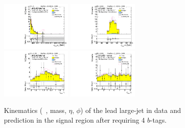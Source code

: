 \begin{figure}[htbp!]
\begin{center}
\includegraphics[width=0.31\textwidth,angle=-90]{figures/boosted/Signal/b77_FourTag_Signal_leadHCand_Pt_m.pdf}
\includegraphics[width=0.31\textwidth,angle=-90]{figures/boosted/Signal/b77_FourTag_Signal_leadHCand_Mass_s.pdf}\\
\includegraphics[width=0.31\textwidth,angle=-90]{figures/boosted/Signal/b77_FourTag_Signal_leadHCand_Eta.pdf}
\includegraphics[width=0.31\textwidth,angle=-90]{figures/boosted/Signal/b77_FourTag_Signal_leadHCand_Phi.pdf}
  \caption{Kinematics (\pt~, mass, $\eta$, $\phi$) of the lead large-\R jet in data and prediction in the signal region after requiring 4 $b$-tags. }
  \label{fig:boosted-4b-signal-ak10-lead}
\end{center}
\end{figure}

